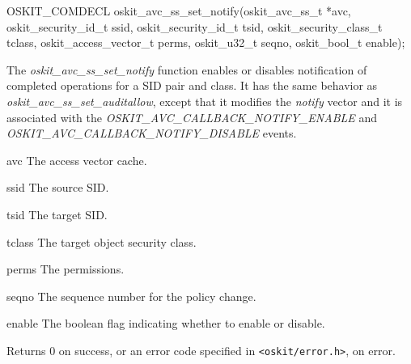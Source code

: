 \begin{apisyn}

	\funcproto OSKIT_COMDECL
	oskit_avc_ss_set_notify(oskit_avc_ss_t *avc, 
		         oskit_security_id_t ssid,
			 oskit_security_id_t tsid,
                         oskit_security_class_t tclass,
			 oskit_access_vector_t perms,
			 oskit_u32_t seqno,
			 oskit_bool_t enable);
\end{apisyn}
\begin{apidesc}

The \emph{oskit\_avc\_ss\_set\_notify} function enables or disables
notification of completed operations for a SID pair and class.  It has
the same behavior as \emph{oskit\_avc\_ss\_set\_auditallow}, except that it
modifies the \emph{notify} vector and it is associated with the
\emph{OSKIT\_AVC\_CALLBACK\_NOTIFY\_ENABLE} and
\emph{OSKIT\_AVC\_CALLBACK\_NOTIFY\_DISABLE} events.

\end{apidesc}
\begin{apiparm}
	\item[avc]
		The access vector cache.
	\item[ssid]
		The source SID.
	\item[tsid]
		The target SID.
	\item[tclass]
		The target object security class.
	\item[perms]
		The permissions.
	\item[seqno]
		The sequence number for the policy change.
	\item[enable]
		The boolean flag indicating whether to enable or disable.
\end{apiparm}
\begin{apiret}
	Returns 0 on success, or an error code specified in
	{\tt <oskit/error.h>}, on error.
\end{apiret}



